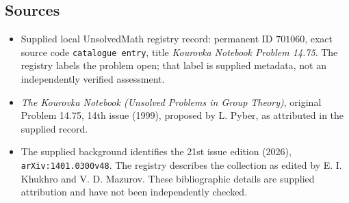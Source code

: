 \documentclass[11pt]{article}
\begin{document}
\subsection{Sources}
\begin{itemize}
\item Supplied local UnsolvedMath registry record: permanent ID \(701060\), exact source code \texttt{catalogue entry}, title \emph{Kourovka Notebook Problem 14.75}. The registry labels the problem open; that label is supplied metadata, not an independently verified assessment.
\item \emph{The Kourovka Notebook (Unsolved Problems in Group Theory)}, original Problem 14.75, 14th issue (1999), proposed by L. Pyber, as attributed in the supplied record.
\item The supplied background identifies the 21st issue edition (2026), \texttt{arXiv:1401.0300v48}. The registry describes the collection as edited by E. I. Khukhro and V. D. Mazurov. These bibliographic details are supplied attribution and have not been independently checked.
\end{itemize}
\end{document}
